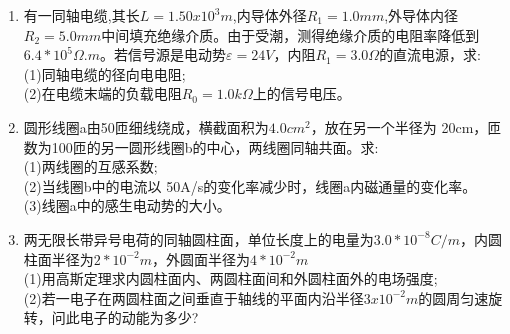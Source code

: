 
\begin{enumerate}
\item 有一同轴电缆,其长$L=1.50x10^3m$,内导体外径$R_1=1.0mm$,外导体内径$R_2=5.0mm$中间填充绝缘介质。由于受潮，测得绝缘介质的电阻率降低到$6.4*10^5\Omega .m$。若信号源是电动势$\varepsilon=24V$，内阻$R_1=3.0\Omega$的直流电源，求:\\
(1)同轴电缆的径向电电阻;\\
(2)在电缆末端的负载电阻$R_0=1.0k \Omega$上的信号电压。
\item 圆形线圈a由50匝细线绕成，横截面积为$4.0cm^2$，放在另一个半径为 20cm，匝数为100匝的另一圆形线圈b的中心，两线圈同轴共面。求:\\
(1)两线圈的互感系数;\\
(2)当线圈b中的电流以 50A/s的变化率减少时，线圈a内磁通量的变化率。\\
(3)线圈a中的感生电动势的大小。
\item 两无限长带异号电荷的同轴圆柱面，单位长度上的电量为$3.0*10^{-8}C/m$，内圆柱面半径为$2*10^{-2}m$，外圆面半径为$4*10^{-2}m$\\
(1)用高斯定理求内圆柱面内、两圆柱面间和外圆柱面外的电场强度;\\
(2)若一电子在两圆柱面之间垂直于轴线的平面内沿半径$3x10^{-2}m$的圆周匀速旋转，问此电子的动能为多少?
\end{enumerate}